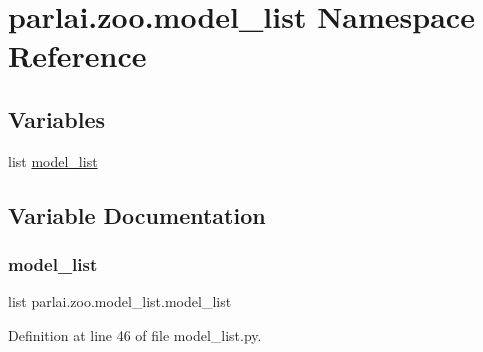 \hypertarget{namespaceparlai_1_1zoo_1_1model__list}{}\section{parlai.\+zoo.\+model\+\_\+list Namespace Reference}
\label{namespaceparlai_1_1zoo_1_1model__list}
\subsection*{Variables}
\begin{DoxyCompactItemize}
\item 
list \hyperlink{namespaceparlai_1_1zoo_1_1model__list_a53bb54e079b1cbe1ada90d01c8ed8f77}{model\+\_\+list}
\end{DoxyCompactItemize}


\subsection{Variable Documentation}
\mbox{\label{namespaceparlai_1_1zoo_1_1model__list_a53bb54e079b1cbe1ada90d01c8ed8f77}} 
\subsubsection{\texorpdfstring{model\+\_\+list}{model\_list}}
{\footnotesize\ttfamily list parlai.\+zoo.\+model\+\_\+list.\+model\+\_\+list}



Definition at line 46 of file model\+\_\+list.\+py.

